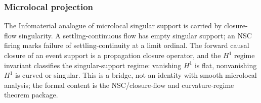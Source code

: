 \subsubsection{Microlocal projection}

\begin{theorem}\label{thm:microlocal-support}\leanok{}
The Infomaterial analogue of microlocal singular support is carried by closure-flow
singularity. A settling-continuous flow has empty singular support; an NSC
firing marks failure of settling-continuity at a limit ordinal. The forward
causal closure of an event support is a propagation closure operator, and the
$H^1$ regime invariant classifies the singular-support regime: vanishing
$H^1$ is flat, nonvanishing $H^1$ is curved or singular. This is a bridge, not
an identity with smooth microlocal analysis; the formal content is the
NSC/closure-flow and curvature-regime theorem package.
\end{theorem}
